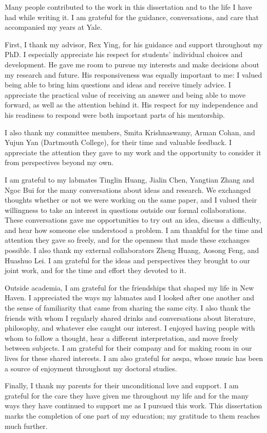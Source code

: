 
Many people contributed to the work in this dissertation and to the life I have had while writing it. I am grateful for the guidance, conversations, and care that accompanied my years at Yale.

First, I thank my advisor, Rex Ying, for his guidance and support throughout my PhD. I especially appreciate his respect for students' individual choices and development. He gave me room to pursue my interests and make decisions about my research and future. His responsiveness was equally important to me: I valued being able to bring him questions and ideas and receive timely advice. I appreciate the practical value of receiving an answer and being able to move forward, as well as the attention behind it. His respect for my independence and his readiness to respond were both important parts of his mentorship.

I also thank my committee members, Smita Krishnaswamy, Arman Cohan, and Yujun Yan (Dartmouth College), for their time and valuable feedback. I appreciate the attention they gave to my work and the opportunity to consider it from perspectives beyond my own.

I am grateful to my labmates Tinglin Huang, Jialin Chen, Yangtian Zhang and Ngoc Bui for the many conversations about ideas and research. We exchanged thoughts whether or not we were working on the same paper, and I valued their willingness to take an interest in questions outside our formal collaborations. These conversations gave me opportunities to try out an idea, discuss a difficulty, and hear how someone else understood a problem. I am thankful for the time and attention they gave so freely, and for the openness that made these exchanges possible. I also thank my external collaborators Zheng Huang, Aosong Feng, and Huashuo Lei. I am grateful for the ideas and perspectives they brought to our joint work, and for the time and effort they devoted to it.

Outside academia, I am grateful for the friendships that shaped my life in New Haven. I appreciated the ways my labmates and I looked after one another and the sense of familiarity that came from sharing the same city. I also thank the friends with whom I regularly shared drinks and conversations about literature, philosophy, and whatever else caught our interest. I enjoyed having people with whom to follow a thought, hear a different interpretation, and move freely between subjects. I am grateful for their company and for making room in our lives for these shared interests. I am also grateful for aespa, whose music has been a source of enjoyment throughout my doctoral studies.

Finally, I thank my parents for their unconditional love and support. I am grateful for the care they have given me throughout my life and for the many ways they have continued to support me as I pursued this work. This dissertation marks the completion of one part of my education; my gratitude to them reaches much further.
